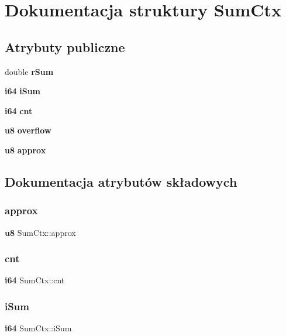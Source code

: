 \section{Dokumentacja struktury Sum\+Ctx}
\label{struct_sum_ctx}
\subsection*{Atrybuty publiczne}
\begin{DoxyCompactItemize}
\item 
double \textbf{ r\+Sum}
\item 
\textbf{ i64} \textbf{ i\+Sum}
\item 
\textbf{ i64} \textbf{ cnt}
\item 
\textbf{ u8} \textbf{ overflow}
\item 
\textbf{ u8} \textbf{ approx}
\end{DoxyCompactItemize}


\subsection{Dokumentacja atrybutów składowych}
\mbox{\label{struct_sum_ctx_a035a2a22271fee066d9a92d12fe3b9a5}} 
\subsubsection{approx}
{\footnotesize\ttfamily \textbf{ u8} Sum\+Ctx\+::approx}

\mbox{\label{struct_sum_ctx_ada00261fe604a7cc6719fdcd8bb5914c}} 
\subsubsection{cnt}
{\footnotesize\ttfamily \textbf{ i64} Sum\+Ctx\+::cnt}

\mbox{\label{struct_sum_ctx_ace6196fb30ebc0687997a723d55683db}} 
\subsubsection{iSum}
{\footnotesize\ttfamily \textbf{ i64} Sum\+Ctx\+::i\+Sum}

\mbox{\label{struct_sum_ctx_a3b14a5da00584aff08314d5e9ddbe9ea}} 
